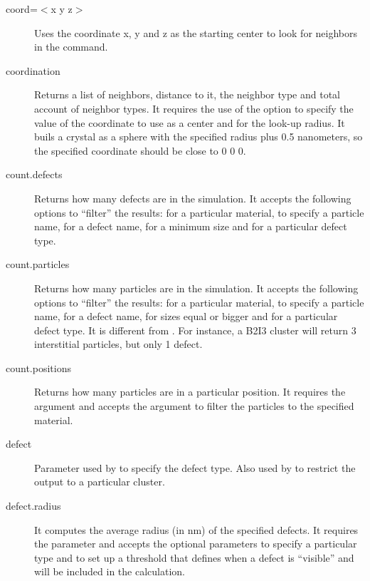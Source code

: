 \begin{description}
\item [coord=$<$x y z$>$] Uses the coordinate x, y and z as the starting center to look for neighbors in the  command.

\item [coordination] Returns a list of neighbors, distance to it, the neighbor type and total account of neighbor types. It requires the use of the option  to specify the value of the coordinate to use as a center and  for the look-up radius. It buils a crystal as a sphere with the specified radius plus 0.5 nanometers, so the specified coordinate should be close to 0 0 0.

\item [count.defects] Returns how many defects are in the simulation. It accepts the following options to ``filter'' the results:  for a particular material,  to specify a particle name,  for a defect name,  for a minimum size and  for a particular defect type.

\item [count.particles] Returns how many particles are in the simulation. It accepts the following options to ``filter'' the results:  for a particular material,  to specify a particle name,  for a defect name,  for sizes equal or bigger and  for a particular defect type. It is different from . For instance, a B2I3 cluster will return 3 interstitial particles, but only 1 defect.

\item [count.positions] Returns how many particles are in a particular position. It requires the argument  and accepts the argument  to filter the particles to the specified material. 

\item [defect] Parameter used by  to specify the defect type. Also used by  to restrict the output to a particular cluster.

\item [defect.radius] It computes the average radius (in nm) of the specified defects. It requires the parameter  and accepts the optional parameters  to specify a particular type and  to set up a threshold that defines when a defect is ``visible'' and will be included in the calculation.


\end{description}
